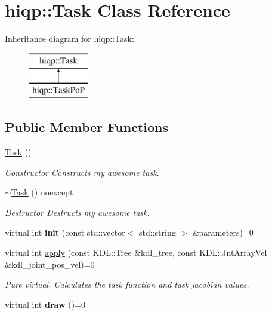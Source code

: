 \hypertarget{classhiqp_1_1Task}{\section{hiqp\-:\-:Task Class Reference}
\label{classhiqp_1_1Task}
}
Inheritance diagram for hiqp\-:\-:Task\-:\begin{figure}[H]
\begin{center}
\leavevmode
\includegraphics[height=2.000000cm]{classhiqp_1_1Task}
\end{center}
\end{figure}
\subsection*{Public Member Functions}
\begin{DoxyCompactItemize}
\item 
\hypertarget{classhiqp_1_1Task_a556692dacc6abb51d0437f59594026d9}{\hyperlink{classhiqp_1_1Task_a556692dacc6abb51d0437f59594026d9}{Task} ()}\label{classhiqp_1_1Task_a556692dacc6abb51d0437f59594026d9}

\begin{DoxyCompactList}\small\item\em Constructor Constructs my awesome task. \end{DoxyCompactList}\item 
\hypertarget{classhiqp_1_1Task_a73b4e41812713f28557c8d15925587db}{\hyperlink{classhiqp_1_1Task_a73b4e41812713f28557c8d15925587db}{$\sim$\-Task} () noexcept}\label{classhiqp_1_1Task_a73b4e41812713f28557c8d15925587db}

\begin{DoxyCompactList}\small\item\em Destructor Destructs my awesome task. \end{DoxyCompactList}\item 
\hypertarget{classhiqp_1_1Task_a02b6ccead41f86f26e7d1b2cb2e013ae}{virtual int {\bfseries init} (const std\-::vector$<$ std\-::string $>$ \&parameters)=0}\label{classhiqp_1_1Task_a02b6ccead41f86f26e7d1b2cb2e013ae}

\item 
virtual int \hyperlink{classhiqp_1_1Task_a2f81c249b39a1fd6557501d61548917b}{apply} (const K\-D\-L\-::\-Tree \&kdl\-\_\-tree, const K\-D\-L\-::\-Jnt\-Array\-Vel \&kdl\-\_\-joint\-\_\-pos\-\_\-vel)=0
\begin{DoxyCompactList}\small\item\em {\itshape Pure virtual}. Calculates the task function and task jacobian values. \end{DoxyCompactList}\item 
\hypertarget{classhiqp_1_1Task_a0d018a8a797cb730111614a9230d59e2}{virtual int {\bfseries draw} ()=0}\label{classhiqp_1_1Task_a0d018a8a797cb730111614a9230d59e2}

\end{DoxyCompactItemize}
